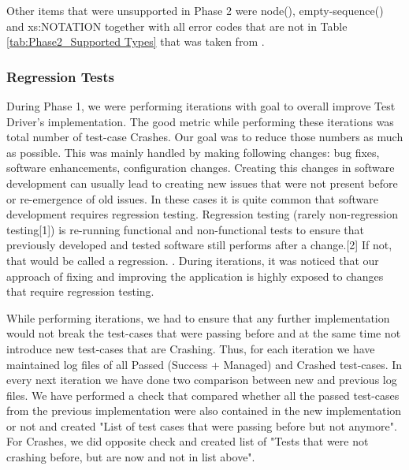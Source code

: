 Other items that were unsupported in Phase 2 were node(), empty-sequence() and xs:NOTATION together with all error codes that are not in Table \ref{tab:Phase2_Supported Types} that was taken from \cite{RumbleSupportedErrorCodes}.

\subsubsection{Regression Tests}
During Phase 1, we were performing iterations with goal to overall improve Test Driver's implementation. The good metric while performing these iterations was total number of test-case Crashes. Our goal was to reduce those numbers as much as possible. This was mainly handled by making following changes: bug fixes, software enhancements, configuration changes. Creating this changes in software development can usually lead to creating new issues that were not present before or re-emergence of old issues. In these cases it is quite common that software development requires regression testing.
 Regression testing (rarely non-regression testing[1]) is re-running functional and non-functional tests to ensure that previously developed and tested software still performs after a change.[2] If not, that would be called a regression. 
. During iterations, it was noticed that our approach of fixing and improving the application is highly exposed to changes that require regression testing. 

While performing iterations, we had to ensure that any further implementation would not break the test-cases that were passing before and at the same time not introduce new test-cases that are Crashing. Thus, for each iteration we have maintained log files of all Passed (Success + Managed) and Crashed test-cases. In every next iteration we have done two comparison between new and previous log files. We have performed a check that compared whether all the passed test-cases from the previous implementation were also contained in the new implementation or not and created "List of test cases that were passing before but not anymore". For Crashes, we did opposite check and created list of "Tests that were not crashing before, but are now and not in list above". 

